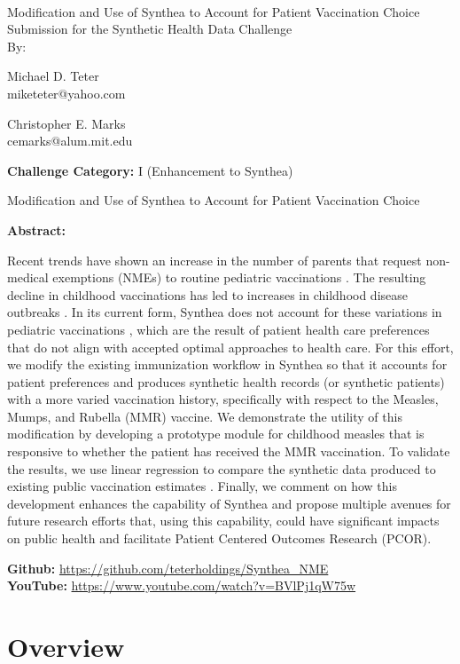 \documentclass[12pt]{article}
\newcommand{\solutiontitle}{Modification and Use of Synthea to Account for Patient Vaccination Choice}
\newcommand{\challengecategory}{I (Enhancement to Synthea)}
\newcommand{\ABSTRACT}{
	Recent trends have shown an increase in the number of parents that request non-medical exemptions (NMEs) to routine pediatric vaccinations \cite{latimes-antivax,antivax}.  The resulting decline in childhood vaccinations has led to increases in childhood disease outbreaks \cite{antivax-data}.  In its current form, Synthea \cite{synthea} does not account for these variations in pediatric vaccinations \cite[p. 15]{challenge-webinar-slides}, which are the result of patient health care preferences that do not align with accepted optimal approaches to health care.  
    For this effort, we modify the existing immunization workflow in Synthea so that it accounts for patient preferences and produces synthetic health records (or synthetic patients) with a more varied vaccination history, specifically with respect to the Measles, Mumps, and Rubella (MMR) vaccine.  We demonstrate the utility of this modification by developing a prototype module for childhood measles that is responsive to whether the patient has received the MMR vaccination.  To validate the results, we use linear regression to compare the synthetic data produced to existing public vaccination estimates \cite{antivax-data}.  Finally, we comment on how this development enhances the capability of Synthea and propose multiple avenues for future research efforts that, using this capability, could have significant impacts on public health and facilitate Patient Centered Outcomes Research (PCOR).
}
\begin{document}

\thispagestyle{empty}

~

\begin{center}
    {\huge \solutiontitle} \\[24pt]
    {\Large Submission for the Synthetic Health Data Challenge} \\[24pt]
    {\Large By:} \\[24pt]
\end{center}

\begin{multicols}{2}
\begin{center}
	Michael D. Teter\\
	miketeter@yahoo.com
\end{center}

\columnbreak

\begin{center}
    Christopher E. Marks\\
    cemarks@alum.mit.edu
\end{center}
\end{multicols}



\noindent \textbf{Challenge Category:} \challengecategory
\\


\clearpage



\setcounter{page}{1}

\begin{center}
    {\LARGE \solutiontitle}
    \\[11pt]
    \begin{minipage}{0.9\textwidth}
      \textbf{Abstract:}
      \ABSTRACT
    \end{minipage}
\end{center}

\noindent \textbf{Github:} \url{https://github.com/teterholdings/Synthea_NME}\\
\noindent \textbf{YouTube:} \url{https://www.youtube.com/watch?v=BVlPj1qW75w}
  
\section{Overview}
\end{document}

